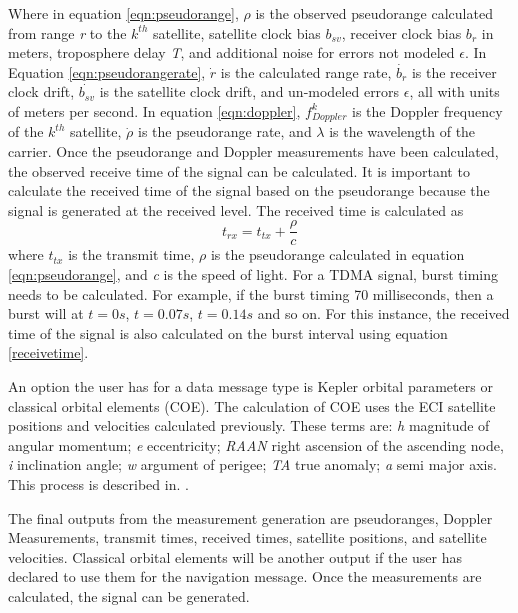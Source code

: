 \documentclass[12pt]{report}
\begin{document}
Where in equation \ref{eqn:pseudorange}, $\rho$ is the observed pseudorange calculated from range \textit{r} to the $k^{th}$ satellite, satellite clock bias $b_{sv}$, receiver clock bias $b_{r}$ in meters, troposphere delay \textit{T},  and additional noise for errors not modeled $\epsilon$. In Equation \ref{eqn:pseudorangerate}, $\dot{r}$ is the calculated range rate, $\dot{b_r}$ is the receiver clock drift, $\dot{b_{sv}}$ is the satellite clock drift, and un-modeled errors $\epsilon$, all with units of meters per second. In equation \ref{eqn:doppler}, $f^{k}_{Doppler}$ is the Doppler frequency of the $k^{th}$ satellite, $\dot{\rho}$ is the pseudorange rate, and $\lambda$ is the wavelength of the carrier. Once the pseudorange and Doppler measurements have been calculated, the observed receive time of the signal can be calculated. It is important to calculate the received time of the signal based on the pseudorange because the signal is generated at the received level. The received time is calculated as 
\begin{equation}
    t_{rx} = t_{tx} + \frac{\rho}{c}
    \label{receivetime}
\end{equation}
where $t_{tx}$ is the transmit time, $\rho$ is the pseudorange calculated in equation \ref{eqn:pseudorange}, and \textit{c} is the speed of light. For a TDMA signal, burst timing needs to be calculated. For example, if the burst timing 70 milliseconds, then a burst will at $t=0s$, $t=0.07s$, $t=0.14s$ and so on. For this instance, the received time of the signal is also calculated on the burst interval using equation \ref{receivetime}.

An option the user has for a data message type is Kepler orbital parameters or classical orbital elements (COE). The calculation of COE uses the ECI satellite positions and velocities calculated previously. These terms are: \textit{h} magnitude of angular momentum; \textit{e} eccentricity; \textit{RAAN} right ascension of the ascending node, \textit{i} inclination angle; \textit{w} argument of perigee; \textit{TA} true anomaly; \textit{a} semi major axis. This process is described in. \cite{curtisOrbitalMechanicsEngineering2008}.

The final outputs from the measurement generation are pseudoranges, Doppler Measurements, transmit times, received times, satellite positions, and satellite velocities. Classical orbital elements will be another output if the user has declared to use them for the navigation message. Once the measurements are calculated, the signal can be generated.
\end{document}
